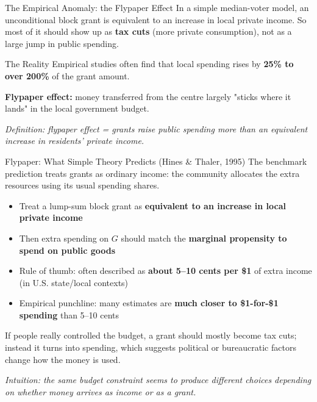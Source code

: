 \documentclass[10pt]{beamer}
\begin{document}
\begin{frame}{The Empirical Anomaly: the Flypaper Effect}
In a simple median-voter model, an unconditional block grant is equivalent to an increase in local private income.
So most of it should show up as \textbf{tax cuts} (more private consumption), not as a large jump in public spending.

\vspace{0.2cm}
\begin{alertblock}{The Reality}
Empirical studies often find that local spending rises by \textbf{25\% to over 200\%} of the grant amount.
\end{alertblock}

\vspace{0.2cm}
\textbf{Flypaper effect:} money transferred from the centre largely "sticks where it lands" in the local government budget.

\vspace{0.1cm}
\footnotesize
\textit{Definition: flypaper effect = grants raise public spending more than an equivalent increase in residents’ private income.}
\end{frame}

\begin{frame}{Flypaper: What Simple Theory Predicts (Hines \& Thaler, 1995)}
\small
The benchmark prediction treats grants as ordinary income: the community allocates the extra resources using its usual spending shares.

\begin{itemize}
\item Treat a lump-sum block grant as \textbf{equivalent to an increase in local private income}
\item Then extra spending on $G$ should match the \textbf{marginal propensity to spend on public goods}
\item Rule of thumb: often described as \textbf{about 5--10 cents per \$1} of extra income (in U.S. state/local contexts)
\item Empirical punchline: many estimates are \textbf{much closer to \$1-for-\$1 spending} than 5--10 cents
\end{itemize}

If people really controlled the budget, a grant should mostly become tax cuts; instead it turns into spending, which suggests political or bureaucratic factors change how the money is used.

\vspace{0.15cm}
\footnotesize
\textit{Intuition: the same budget constraint seems to produce different choices depending on whether money arrives as income or as a grant.}
\end{frame}
\end{document}
